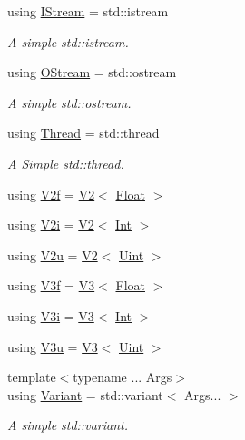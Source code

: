 \begin{DoxyCompactItemize}
using \mbox{\hyperlink{namespaceo_a_ae8cec630e608110423350d900ee22e73}{I\+Stream}} = std\+::istream
\begin{DoxyCompactList}\small\item\em A simple std\+::istream. \end{DoxyCompactList}\item 
using \mbox{\hyperlink{namespaceo_a_ab69b2110953f22401259db9c6ddc7905}{O\+Stream}} = std\+::ostream
\begin{DoxyCompactList}\small\item\em A simple std\+::ostream. \end{DoxyCompactList}\item 
using \mbox{\hyperlink{namespaceo_a_a38e502e26381eb0b98c9a03430e4dcce}{Thread}} = std\+::thread
\begin{DoxyCompactList}\small\item\em A Simple std\+::thread. \end{DoxyCompactList}\item 
using \mbox{\hyperlink{namespaceo_a_a6de6b1704d5ba4ceac954fdebaee0d79}{V2f}} = \mbox{\hyperlink{structo_a_1_1_v2}{V2}}$<$ \mbox{\hyperlink{namespaceo_a_a513e9cb16924b482268ab3fcdf1f2499}{Float}} $>$
\item 
using \mbox{\hyperlink{namespaceo_a_aeddbfac9ac1bbff3d9640251439b33aa}{V2i}} = \mbox{\hyperlink{structo_a_1_1_v2}{V2}}$<$ \mbox{\hyperlink{namespaceo_a_aa575525a7b0116822c73d43fa671a58c}{Int}} $>$
\item 
using \mbox{\hyperlink{namespaceo_a_a20f57c861441be662b592b15a492f29e}{V2u}} = \mbox{\hyperlink{structo_a_1_1_v2}{V2}}$<$ \mbox{\hyperlink{namespaceo_a_abe1d8250226c5cf34f84d7b75fc7922e}{Uint}} $>$
\item 
using \mbox{\hyperlink{namespaceo_a_a795c21de788620b8fb6c14bf3046dcf9}{V3f}} = \mbox{\hyperlink{structo_a_1_1_v3}{V3}}$<$ \mbox{\hyperlink{namespaceo_a_a513e9cb16924b482268ab3fcdf1f2499}{Float}} $>$
\item 
using \mbox{\hyperlink{namespaceo_a_a1b5e3fb31926401708aa4000145a58ef}{V3i}} = \mbox{\hyperlink{structo_a_1_1_v3}{V3}}$<$ \mbox{\hyperlink{namespaceo_a_aa575525a7b0116822c73d43fa671a58c}{Int}} $>$
\item 
using \mbox{\hyperlink{namespaceo_a_ae91b6ba950b8f72e43ee17b69dbfeaad}{V3u}} = \mbox{\hyperlink{structo_a_1_1_v3}{V3}}$<$ \mbox{\hyperlink{namespaceo_a_abe1d8250226c5cf34f84d7b75fc7922e}{Uint}} $>$
\item 
{\footnotesize template$<$typename ... Args$>$ }\\using \mbox{\hyperlink{namespaceo_a_a46a1498e4e673b19327a24fac0018867}{Variant}} = std\+::variant$<$ Args... $>$
\begin{DoxyCompactList}\small\item\em A simple std\+::variant. \end{DoxyCompactList}\end{DoxyCompactItemize}
